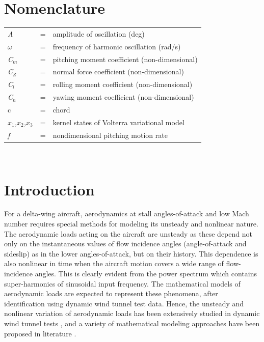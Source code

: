 \documentclass{AIAA}
\begin{document}
\section*{Nomenclature}
\noindent\begin{tabular}{@{}lcl@{}}
\textit{A}  &=& amplitude of oscillation (deg)\\
\textit{$\omega$ }&=&  frequency of harmonic oscillation (rad/s) \\
\textit{C}$_{m}$&=& pitching moment coefficient (non-dimensional) \\
\textit{C}$_{Z}$&=& normal force coefficient (non-dimensional)\\
\textit{C}$_{l}$&=& rolling moment coefficient (non-dimensional)\\
\textit{C}$_{n}$&=& yawing moment coefficient (non-dimensional)\\
c   &=& chord \\
\textit{$x_1$,$x_2$,$x_3$} &=& kernel states of Volterra variational model \\
\textit{f}  &=& nondimensional pitching motion rate
\end{tabular} \\


\section{Introduction}


For a delta-wing aircraft, aerodynamics at stall angles-of-attack and low Mach number requires special methods for modeling its unsteady and nonlinear nature. The aerodynamic loads acting on the aircraft are unsteady as these depend not only on the instantaneous values of flow incidence angles (angle-of-attack and sideslip) as in the lower angles-of-attack, but on their history. This dependence is also nonlinear in time when the aircraft motion covers a wide range of flow-incidence angles. This is clearly evident from the power spectrum which contains super-harmonics of sinusoidal input frequency. The mathematical models of aerodynamic loads are expected to represent these phenomena, after identification using dynamic wind tunnel test data. Hence, the unsteady and nonlinear variation of aerodynamic loads has been extensively studied in dynamic wind tunnel tests \cite{AGARDAR305}, and a variety of mathematical modeling approaches have been proposed in literature \cite{Goman94,Tobak1,GreReview}.
\end{document}
